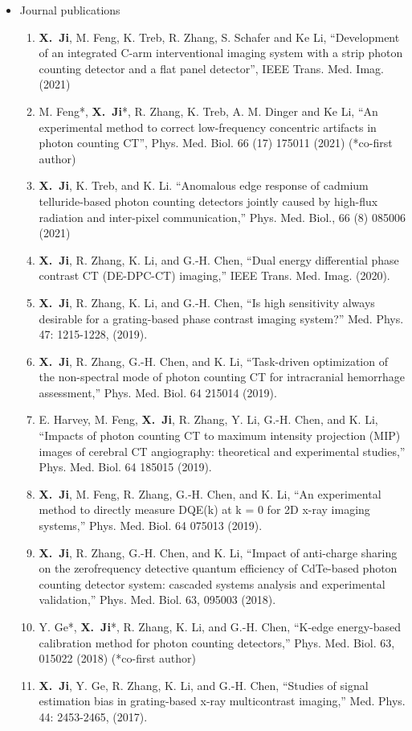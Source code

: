 \documentclass[letterpaper,11pt]{article}
\newcommand{\xji}{\textbf{X.~Ji}}
\begin{document}
\begin{itemize}
\item Journal publications
\begin{enumerate}\justifying
\item \xji, M. Feng, K. Treb, R. Zhang, S. Schafer and Ke Li, “Development of an integrated C-arm interventional imaging system with a strip photon counting detector and a flat panel detector”, IEEE Trans. Med. Imag. (2021)
\item M. Feng*, \xji*, R. Zhang, K. Treb, A. M. Dinger and Ke Li, “An experimental method to correct low-frequency concentric artifacts in photon counting CT”, Phys. Med. Biol. 66 (17) 175011 (2021) (*co-first author)
\item \xji, K. Treb, and K. Li. “Anomalous edge response of cadmium telluride-based photon counting detectors jointly caused by high-flux radiation and inter-pixel communication,” Phys. Med. Biol., 66 (8) 085006 (2021)
\item \xji, R. Zhang, K. Li, and G.-H. Chen, ``Dual energy differential phase contrast CT (DE-DPC-CT) imaging,'' IEEE Trans. Med. Imag. (2020).
\item \xji, R. Zhang, K. Li, and G.-H. Chen, ``Is high sensitivity always desirable for a grating-based phase contrast imaging system?'' Med. Phys. 47: 1215-1228, (2019).
\item \xji, R. Zhang, G.-H. Chen, and K. Li, ``Task-driven optimization of the non-spectral mode of photon counting CT for intracranial hemorrhage assessment,'' Phys. Med. Biol. 64 215014 (2019).
\item E. Harvey, M. Feng, \xji, R. Zhang, Y. Li, G.-H. Chen, and K. Li, ``Impacts of photon counting CT to maximum intensity projection (MIP) images of cerebral CT angiography: theoretical and experimental studies,'' Phys. Med. Biol. 64 185015 (2019).
\item \xji, M. Feng, R. Zhang, G.-H. Chen, and K. Li, ``An experimental method to directly measure DQE(k) at k = 0 for 2D x-ray imaging systems,'' Phys. Med. Biol. 64 075013 (2019).
\item \xji, R. Zhang, G.-H. Chen, and K. Li, ``Impact of anti-charge sharing on the zerofrequency detective quantum efficiency of CdTe-based photon counting detector system: cascaded systems analysis and experimental validation,'' Phys. Med. Biol. 63, 095003 (2018).
\item Y. Ge*, \xji*, R. Zhang, K. Li, and G.-H. Chen, ``K-edge energy-based calibration method for photon counting detectors,'' Phys. Med. Biol. 63, 015022 (2018) (*co-first author)
\item \xji, Y. Ge, R. Zhang, K. Li, and G.-H. Chen, ``Studies of signal estimation bias in grating-based x-ray multicontrast imaging,'' Med. Phys. 44: 2453-2465, (2017).
\end{enumerate}


\end{itemize}
\end{document}
